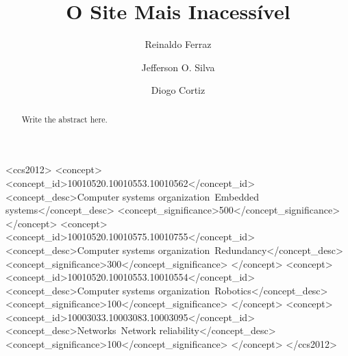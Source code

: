\documentclass[sigconf]{acmart}
\begin{document}
\title{O Site Mais Inacessível}

\author{Reinaldo Ferraz}

\author{Jefferson O. Silva}

\author{Diogo Cortiz}



\renewcommand{\shortauthors}{Ferraz, et al.}

\begin{abstract}
  Write the abstract here.
\end{abstract}

\begin{CCSXML}
<ccs2012>
 <concept>
  <concept_id>10010520.10010553.10010562</concept_id>
  <concept_desc>Computer systems organization~Embedded systems</concept_desc>
  <concept_significance>500</concept_significance>
 </concept>
 <concept>
  <concept_id>10010520.10010575.10010755</concept_id>
  <concept_desc>Computer systems organization~Redundancy</concept_desc>
  <concept_significance>300</concept_significance>
 </concept>
 <concept>
  <concept_id>10010520.10010553.10010554</concept_id>
  <concept_desc>Computer systems organization~Robotics</concept_desc>
  <concept_significance>100</concept_significance>
 </concept>
 <concept>
  <concept_id>10003033.10003083.10003095</concept_id>
  <concept_desc>Networks~Network reliability</concept_desc>
  <concept_significance>100</concept_significance>
 </concept>
</ccs2012>
\end{CCSXML}
\end{document}
